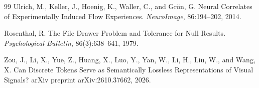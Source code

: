 \documentclass[11pt]{article}
\begin{document}
\begin{thebibliography}{99}
 Ulrich, M., Keller, J., Hoenig, K., Waller, C., and Gr\"on, G. Neural Correlates of Experimentally Induced Flow Experiences. \emph{NeuroImage}, 86:194--202, 2014.

 Rosenthal, R. The File Drawer Problem and Tolerance for Null Results. \emph{Psychological Bulletin}, 86(3):638--641, 1979.

 Zou, J., Li, X., Yue, Z., Huang, X., Luo, Y., Yan, W., Li, H., Liu, W., and Wang, X. Can Discrete Tokens Serve as Semantically Lossless Representations of Visual Signals? arXiv preprint arXiv:2610.37662, 2026.

\end{thebibliography}
\end{document}
